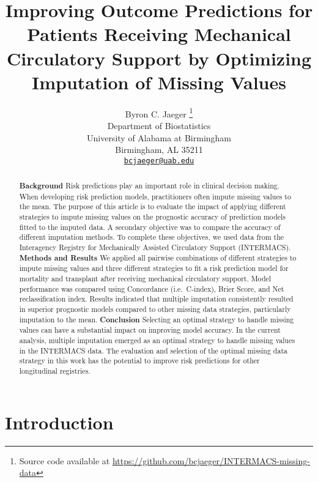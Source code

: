 \documentclass{article}
\title{Improving Outcome Predictions for Patients Receiving Mechanical
Circulatory Support by Optimizing Imputation of Missing Values}
\author{
    Byron C. Jaeger
    \thanks{Source code available at
\url{https://github.com/bcjaeger/INTERMACS-missing-data}}
   \\
    Department of Biostatistics \\
    University of Alabama at Birmingham \\
  Birmingham, AL 35211 \\
  \texttt{\href{mailto:bcjaeger@uab.edu}{\nolinkurl{bcjaeger@uab.edu}}} \\
  }
\begin{document}
\maketitle

\def\tightlist{}


\begin{abstract}
\textbf{Background} Risk predictions play an important role in clinical
decision making. When developing risk prediction models, practitioners
often impute missing values to the mean. The purpose of this article is
to evaluate the impact of applying different strategies to impute
missing values on the prognostic accuracy of prediction models fitted to
the imputed data. A secondary objective was to compare the accuracy of
different imputation methods. To complete these objectives, we used data
from the Interagency Registry for Mechanically Assisted Circulatory
Support (INTERMACS). \newline\textbf{Methods and Results} We applied all
pairwise combinations of different strategies to impute missing values
and three different strategies to fit a risk prediction model for
mortality and transplant after receiving mechanical circulatory support.
Model performance was compared using Concordance (i.e.~C-index), Brier
Score, and Net reclassification index. Results indicated that multiple
imputation consistently resulted in superior prognostic models compared
to other missing data strategies, particularly imputation to the mean.
\newline\textbf{Conclusion} Selecting an optimal strategy to handle
missing values can have a substantial impact on improving model
accuracy. In the current analysis, multiple imputation emerged as an
optimal strategy to handle missing values in the INTERMACS data. The
evaluation and selection of the optimal missing data strategy in this
work has the potential to improve risk predictions for other
longitudinal registries.
\end{abstract}


\hypertarget{introduction}{%
\section{Introduction}\label{introduction}}

\label{sec:introduction}
\end{document}
